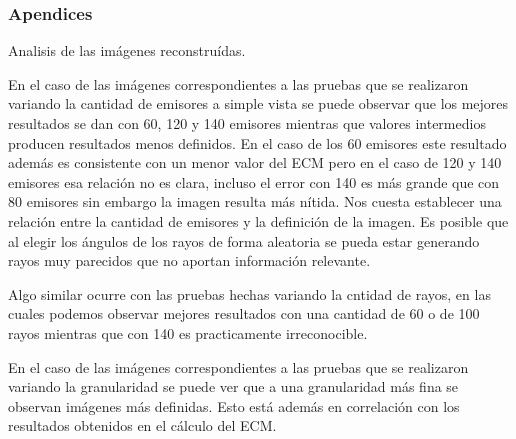 \subsubsection*{Apendices}


Analisis de las imágenes reconstruídas.

En el caso de las imágenes correspondientes a las pruebas que se realizaron variando la cantidad de emisores a simple vista se puede observar que los mejores resultados se dan con 60, 120 y 140 emisores mientras que valores intermedios producen resultados menos definidos. En el caso de los 60 emisores este resultado además es consistente con un menor valor del ECM pero en el caso de 120 y 140 emisores esa relación no es clara, incluso el error con 140 es más grande que con 80 emisores sin embargo la imagen resulta más nítida. Nos cuesta establecer una relación entre la cantidad de emisores y la definición de la imagen. Es posible que al elegir los ángulos de los rayos de forma aleatoria se pueda estar generando rayos muy parecidos que no aportan información relevante.

Algo similar ocurre con las pruebas hechas variando la cntidad de rayos, en las cuales podemos observar mejores resultados con una cantidad de 60 o de 100 rayos mientras que con 140 es practicamente irreconocible.

En el caso de las imágenes correspondientes a las pruebas que se realizaron variando la granularidad se puede ver que a una granularidad más fina se observan imágenes más definidas. Esto está además en correlación con los resultados obtenidos en el cálculo del ECM.



